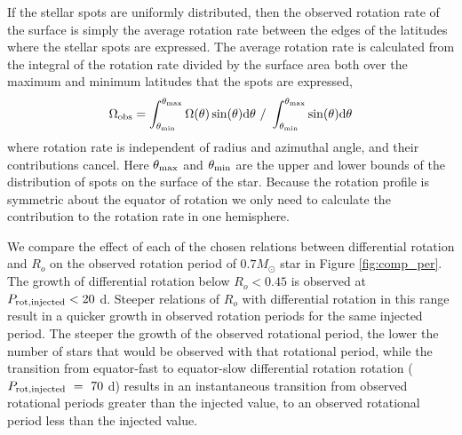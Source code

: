 If the stellar spots are uniformly distributed, then the observed rotation rate of the surface is simply the average rotation rate between the edges of the latitudes where the stellar spots are expressed.
The average rotation rate is calculated from the integral of the rotation rate divided by the surface area both over the maximum and minimum latitudes that the spots are expressed,
\begin{equation}
\label{eq:inte}
	\Omega_{\rm{obs}} = \int^{\theta_{\rm{max}}}_{\theta_{\rm{min}}} \Omega(\theta) \sin(\theta) \rm{d}\theta \ / \  \int^{\theta_{\rm{max}}}_{\theta_{\rm{min}}} \sin(\theta) \rm{d}\theta
\end{equation}
where rotation rate is independent of radius and azimuthal angle, and their contributions cancel.
Here $\theta_{\rm{max}}$ and $\theta_{\rm{min}}$ are the upper and lower bounds of the distribution of spots on the surface of the star.
Because the rotation profile is symmetric about the equator of rotation we only need to calculate the contribution to the rotation rate in one hemisphere.

We compare the effect of each of the chosen relations between differential rotation and $R_o$ on the observed rotation period of $0.7 M_{\odot}$ star in Figure \ref{fig:comp_per}.
The growth of differential rotation below $R_o <  0.45$ is observed at $P_{\rm{rot, injected}} < 20$ d.
Steeper relations of $R_o$ with differential rotation in this range result in a quicker growth in observed rotation periods for the same injected period.
The steeper the growth of the observed rotational period, the lower the number of stars that would be observed with that rotational period, while the transition from equator-fast to equator-slow differential rotation rotation ($P_{\rm{rot, injected}} \ = \ 70$ d) results in an instantaneous transition from observed rotational periods greater than the injected value, to an observed rotational period less than the injected value.

